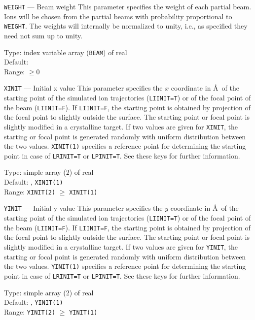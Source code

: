 \begin{keydescription}{\texttt{WEIGHT} --- Beam weight}
%
  This parameter specifies the weight of each partial beam. Ions will be chosen
  from the partial beams with probability proportional to \texttt{WEIGHT}. The
  weights will internally be normalized to unity, i.e., as specified they need
  not sum up to unity.
%
  \begin{keytab}
    Type:    \> index variable array (\texttt{BEAM}) of real \\
    Default:  \\
    Range:   \> $\ge 0$
  \end{keytab}
\end{keydescription}

\begin{keydescription}{\texttt{XINIT} --- Initial x value}
%
  This parameter specifies the $x$ coordinate in \AA\ of the starting point of
  the simulated ion trajectories (\texttt{LIINIT=T}) or of the focal point of the
  beam (\texttt{LIINIT=F}). If \texttt{LIINIT=F}, the starting point is obtained
  by projection of the focal point to slightly outside the surface. The starting
  point or focal point is slightly modified in a crystalline target. If
  two values are given for \texttt{XINIT}, the starting or focal point is
  generated randomly with uniform distribution between the two values.
  \ifprivate 
    \texttt{XINIT(1)} specifies a reference point for determining the
    starting point in case of \texttt{LRINIT=T} or \texttt{LPINIT=T}.
    See these keys for further information.
  \fi
%
  \begin{keytab}
    Type:    \> simple array (2) of real \\
    Default: , \texttt{XINIT(1)} \\
    Range:   \> \texttt{XINIT(2)} $\ge$ \texttt{XINIT(1)}
  \end{keytab}
\end{keydescription}

\begin{keydescription}{\texttt{YINIT} --- Initial y value}
%
  This parameter specifies the $y$ coordinate in \AA\ of the starting point of
  the simulated ion trajectories (\texttt{LIINIT=T}) or of the focal point of the
  beam (\texttt{LIINIT=F}). If \texttt{LIINIT=F}, the starting point is obtained
  by projection of the focal point to slightly outside the surface. The starting
  point or focal point is slightly modified in a crystalline target. If
  two values are given for \texttt{YINIT}, the starting or focal point is
  generated randomly with uniform distribution between the two values.
  \ifprivate 
    \texttt{YINIT(1)} specifies a reference point for determining the
    starting point in case of \texttt{LRINIT=T} or \texttt{LPINIT=T}.
    See these keys for further information.
  \fi
%
  \begin{keytab}
    Type:    \> simple array (2) of real \\
    Default: , \texttt{YINIT(1)} \\
    Range:   \> \texttt{YINIT(2)} $\ge$ \texttt{YINIT(1)}
  \end{keytab}
\end{keydescription}

